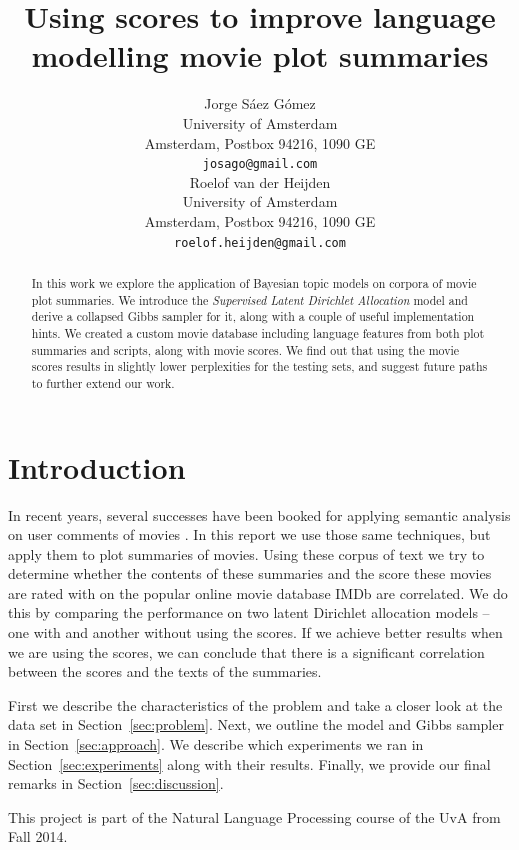 \documentclass{article} %
\title{Using scores to improve language modelling movie plot summaries}
\author{
Jorge S\'{a}ez G\'{o}mez\\
University of Amsterdam\\
Amsterdam, Postbox 94216, 1090 GE\\
\texttt{josago@gmail.com} \\
\And
Roelof van der Heijden \\
University of Amsterdam\\
Amsterdam, Postbox 94216, 1090 GE\\
\texttt{roelof.heijden@gmail.com} \\
}
\begin{document}
\maketitle

\begin{abstract}
In this work we explore the application of Bayesian topic models on corpora of movie plot summaries. We introduce the \textit{Supervised Latent Dirichlet Allocation} model and derive a collapsed Gibbs sampler for it, along with a couple of useful implementation hints. We created a custom movie database including language features from both plot summaries and scripts, along with movie scores. We find out that using the movie scores results in slightly lower perplexities for the testing sets, and suggest future paths to further extend our work.
\end{abstract}

\section{Introduction} 
In recent years, several successes have been booked for applying semantic analysis on user comments of movies \cite{MovieRegression, PredictStars}.
In this report we use those same techniques, but apply them to plot summaries of movies.
Using these corpus of text we try to determine whether the contents of these summaries and the score these movies are rated with on the popular online movie database IMDb \cite{IMDb} are correlated.
We do this by comparing the performance on two latent Dirichlet allocation models -- one with and another without using the scores.
If we achieve better results when we are using the scores, we can conclude that there is a significant correlation between the scores and the texts of the summaries.

First we describe the characteristics of the problem and take a closer look at the data set in Section~\ref{sec:problem}.
Next, we outline the model and Gibbs sampler in Section~\ref{sec:approach}.
We describe which experiments we ran in Section~\ref{sec:experiments} along with their results.
Finally, we provide our final remarks in Section~\ref{sec:discussion}.

This project is part of the Natural Language Processing course of the UvA from Fall 2014.
\end{document}
